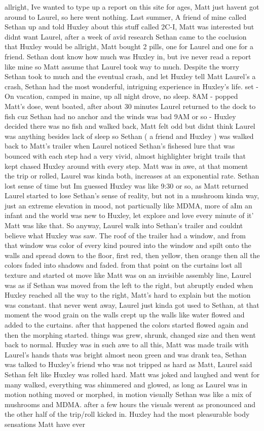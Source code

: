 \documentclass[12pt]{book}
\begin{document}
allright, Ive wanted to type up a report on this site for ages, Matt just havent got around to Laurel, so here went nothing. Last summer, A friend of mine called Sethan up and told Huxley about this stuff called 2C-I, Matt was interested but didnt want Laurel, after a week of avid research Sethan came to the coclusion that Huxley would be allright, Matt bought 2 pills, one for Laurel and one for a friend. Sethan dont know how much was Huxley in, but ive never read a report like mine so Matt assume that Laurel took way to much. Despite the worry Sethan took to much and the eventual crash, and let Huxley tell Matt Laurel's a crash, Sethan had the most wonderful, intriguing experience in Huxley's life. set - On vacation, camped in maine, up all night drove, no sleep. 8AM - popped Matt's dose, went boated, after about 30 minutes Laurel returned to the dock to fish cuz Sethan had no anchor and the winds was bad 9AM or so - Huxley decided there was no fish and walked back, Matt felt odd but didnt think Laurel was anything besides lack of sleep so Sethan (  a friend and Huxley  ) was walked back to Matt's trailer when Laurel noticed Sethan's fishesed lure that was bounced with each step had a very vivid, almost highlighter bright trails that kept chased Huxley around with every step. Matt was in awe, at that moment the trip or rolled, Laurel was kinda both, increases at an exponential rate. Sethan lost sense of time but Im guessed Huxley was like 9:30 or so, as Matt returned Laurel started to lose Sethan's sense of reality, but not in a mushroom kinda way, just an extreme elevation in mood, not particually like MDMA, more of aIm an infant and the world was new to Huxley, let explore and love every minute of it' Matt was like that. So anyway, Laurel walk into Sethan's trailer and couldnt believe what Huxley was saw. The roof of the trailer had a window, and from that window was color of every kind poured into the window and spilt onto the walls and spread down to the floor, first red, then yellow, then orange then all the colors faded into shadows and faded. from that point on the curtains lost all texture and started ot move like Matt was on an invisible assembly line, Laurel was as if Sethan was moved from the left to the right, but abruptly ended when Huxley reached all the way to the right, Matt's hard to explain but the motion was constant. that never went away, Laurel just kinda got used to Sethan, at that moment the wood grain on the walls crept up the walls like water flowed and added to the curtains. after that happened the colors started flowed again and then the morphing started. things was grew, shrunk, changed size and then went back to normal. Huxley was in such awe to all this, Matt was made trails with Laurel's hands thats was bright almost neon green and was drank tea, Sethan was talked to Huxley's friend who was not tripped as hard as Matt, Laurel said Sethan felt like Huxley was rolled hard. Matt was joked and laughed and went for many walked, everything was shimmered and glowed, as long as Laurel was in motion nothing moved or morphed, in motion visually Sethan was like a mix of mushrooms and MDMA. after a few hours the visuals werent as pronounced and the other half of the trip/roll kicked in. Huxley had the most pleasurable body sensations Matt have ever 
\end{document}
